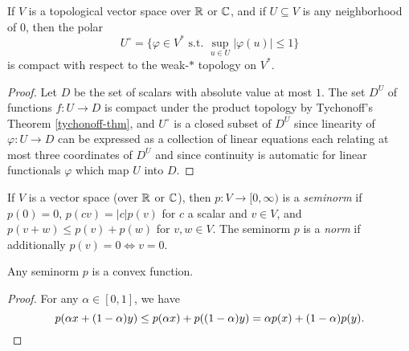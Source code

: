 \begin{thm}[Alaoglu] If $V$ is a topological vector space over $\mathbb{R}$ or $\mathbb{C}$, and if $U \subseteq V$ is any neighborhood of $0$, then the polar
\[
U^\circ = \{\varphi \in V^* \text{ s.t. } \sup_{u \in U} |\varphi(u)| \le 1\}
\]
is compact with respect to the weak-$*$ topology on $V^*$.
\end{thm}
\begin{proof} Let $D$ be the set of scalars with absolute value at most $1$. The set $D^U$ of functions $f : U \rightarrow D$ is compact under the product topology by Tychonoff's Theorem \ref{tychonoff-thm}, and $U^\circ$ is a closed subset of $D^U$ since linearity of $\varphi : U \rightarrow D$ can be expressed as a collection of linear equations each relating at most three coordinates of $D^U$ and since continuity is automatic for linear functionals $\varphi$ which map $U$ into $D$.
\end{proof}

\begin{defn} If $V$ is a vector space (over $\mathbb{R}$ or $\mathbb{C}$), then $p:V \rightarrow [0,\infty)$ is a \emph{seminorm} if $p(0) = 0$, $p(cv) = |c|p(v)$ for $c$ a scalar and $v\in V$, and $p(v+w) \le p(v) + p(w)$ for $v,w \in V$. The seminorm $p$ is a \emph{norm} if additionally $p(v) = 0 \iff v = 0$.
\end{defn}

\begin{prop} Any seminorm $p$ is a convex function.
\end{prop}
\begin{proof} For any $\alpha \in [0,1]$, we have
\[
p(\alpha x + (1-\alpha)y) \le p(\alpha x) + p((1-\alpha)y) = \alpha p(x) + (1-\alpha) p(y).\qedhere
\]
\end{proof}

